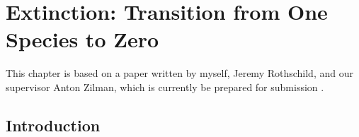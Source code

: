 \chapter{Extinction: Transition from One Species to Zero}%





This chapter is based on a paper written by myself, Jeremy Rothschild, and our supervisor Anton Zilman, which is currently be prepared for submission \cite{Badali2019b}. 

\section{Introduction} \label{Introduction}%


